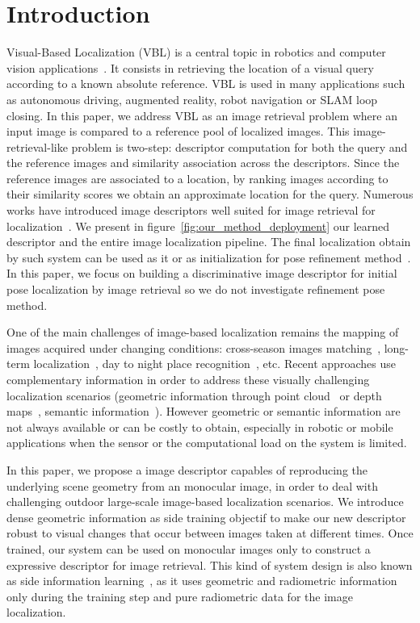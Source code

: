 \section{Introduction}
\label{sec:intro}

Visual-Based Localization (VBL) is a central topic in robotics and computer vision applications~\cite{Piasco2017}. It consists in retrieving the location of a visual query according to a known absolute reference. VBL is used in many applications such as autonomous driving, augmented reality, robot navigation or SLAM loop closing. In this paper, we address VBL as an image retrieval problem where an input image is compared to a reference pool of localized images. This image-retrieval-like problem is two-step: descriptor computation for both the query and the reference images and similarity association across the descriptors. Since the reference images are associated to a location, by ranking images according to their similarity scores we obtain an approximate location for the query. Numerous works have introduced image descriptors well suited for image retrieval for localization~\cite{Arandjelovic2017,Kim2017a,Gordo2017,Radenovic2017,Liu2018}. We present in figure~\ref{fig:our_method_deployment} our learned descriptor and the entire image localization pipeline. The final localization obtain by such system can be used as it or as initialization for pose refinement method~\cite{Sattler2017a, Sarlin2018a, Piasco2019a}. In this paper, we focus on building a discriminative image descriptor for initial pose localization by image retrieval so we do not investigate refinement pose method.

One of the main challenges of image-based localization remains the mapping of images acquired under changing conditions: cross-season images matching~\cite{Naseer2017a}, long-term localization~\cite{Toft2018}, day to night place recognition~\cite{Torii2015}, etc. Recent approaches use complementary information in order to address these visually challenging localization scenarios (geometric information through point cloud~\cite{Sattler2018,Schonberger2018} or depth maps~\cite{Christie2016}, semantic information~\cite{Ardeshir2014,Christie2016,Naseer2017a}). However geometric or semantic information are not always available or can be costly to obtain, especially in robotic or mobile applications when the sensor or the computational load on the system is limited.

In this paper, we propose a image descriptor capables of reproducing the underlying scene geometry from an monocular image, in order to deal with challenging outdoor large-scale image-based localization scenarios. We introduce dense geometric information as side training objectif to make our new descriptor robust to visual changes that occur between images taken at different times. Once trained, our system can be used on monocular images only to construct a expressive descriptor for image retrieval. This kind of system design is also known as side information learning~\cite{Hoffman2016}, as it uses geometric and radiometric information only during the training step and pure radiometric data for the image localization. 

